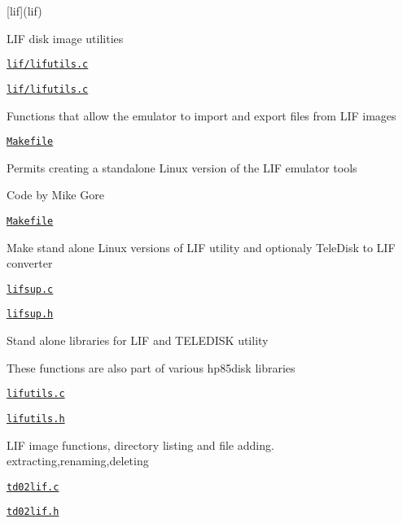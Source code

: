 \begin{DoxyItemize}
\item \mbox{[}lif\mbox{]}(lif)
\begin{DoxyItemize}
\item L\+IF disk image utilities
\item \href{lif/lifutils.c}{\tt lif/lifutils.\+c}
\item \href{lif/lifutils.c}{\tt lif/lifutils.\+c}
\begin{DoxyItemize}
\item Functions that allow the emulator to import and export files from L\+IF images
\end{DoxyItemize}
\item \href{lif/Makefile}{\tt Makefile}
\begin{DoxyItemize}
\item Permits creating a standalone Linux version of the L\+IF emulator tools
\end{DoxyItemize}
\item Code by Mike Gore
\begin{DoxyItemize}
\item \href{lif/Makefile}{\tt Makefile}
\begin{DoxyItemize}
\item Make stand alone Linux versions of L\+IF utility and optionaly Tele\+Disk to L\+IF converter
\end{DoxyItemize}
\item \href{lif/lifsup.c}{\tt lifsup.\+c}
\item \href{lif/lifsup.h}{\tt lifsup.\+h}
\begin{DoxyItemize}
\item Stand alone libraries for L\+IF and T\+E\+L\+E\+D\+I\+SK utility
\begin{DoxyItemize}
\item These functions are also part of various hp85disk libraries
\end{DoxyItemize}
\end{DoxyItemize}
\item \href{lif/lifutils.c}{\tt lifutils.\+c}
\item \href{lif/lifutils.h}{\tt lifutils.\+h}
\begin{DoxyItemize}
\item L\+IF image functions, directory listing and file adding. extracting,renaming,deleting
\end{DoxyItemize}
\item \href{lif/td02lif.c}{\tt td02lif.\+c}
\item \href{lif/td02lif.h}{\tt td02lif.\+h}

\end{DoxyItemize}
\end{DoxyItemize}
\end{DoxyItemize}

